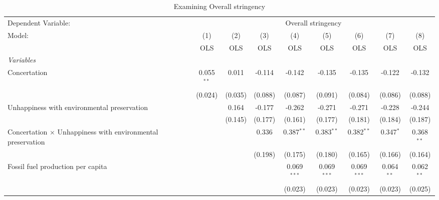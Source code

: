 
\begin{table}[htbp]
   \caption{Examining Overall stringency}
   \centering
   \begin{tabular}{lcccccccc}
      \toprule
      Dependent Variable: & \multicolumn{8}{c}{Overall stringency}\\
      Model:                                                             & (1)          & (2)     & (3)     & (4)           & (5)           & (6)           & (7)          & (8)\\  
                                                                         &  OLS         & OLS     & OLS     & OLS           & OLS           & OLS           & OLS          & OLS\\  
      \midrule
      \emph{Variables}\\
      Concertation                                                       & 0.055$^{**}$ & 0.011   & -0.114  & -0.142        & -0.135        & -0.135        & -0.122       & -0.132\\   
                                                                         & (0.024)      & (0.035) & (0.088) & (0.087)       & (0.091)       & (0.084)       & (0.086)      & (0.088)\\   
      Unhappiness with environmental preservation                        &              & 0.164   & -0.177  & -0.262        & -0.271        & -0.271        & -0.228       & -0.244\\   
                                                                         &              & (0.145) & (0.177) & (0.161)       & (0.177)       & (0.181)       & (0.184)      & (0.187)\\   
      Concertation $\times$ Unhappiness with environmental preservation  &              &         & 0.336   & 0.387$^{**}$  & 0.383$^{**}$  & 0.382$^{**}$  & 0.347$^{*}$  & 0.368$^{**}$\\   
                                                                         &              &         & (0.198) & (0.175)       & (0.180)       & (0.165)       & (0.166)      & (0.164)\\   
      Fossil fuel production per capita                                  &              &         &         & 0.069$^{***}$ & 0.069$^{***}$ & 0.069$^{***}$ & 0.064$^{**}$ & 0.062$^{**}$\\   
                                                                         &              &         &         & (0.023)       & (0.023)       & (0.023)       & (0.023)      & (0.025)\\   

\end{tabular}
\end{table}
